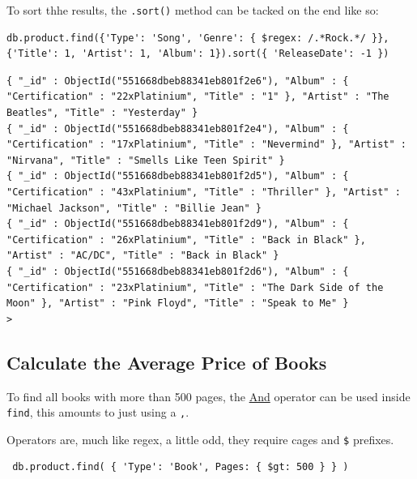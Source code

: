 \documentclass[11pt]{article}
\begin{document}
To sort thhe results, the \texttt{.sort()} method can be tacked on the end like so:

\begin{verbatim}
db.product.find({'Type': 'Song', 'Genre': { $regex: /.*Rock.*/ }}, {'Title': 1, 'Artist': 1, 'Album': 1}).sort({ 'ReleaseDate': -1 })
\end{verbatim}

\begin{verbatim}
{ "_id" : ObjectId("551668dbeb88341eb801f2e6"), "Album" : { "Certification" : "22xPlatinium", "Title" : "1" }, "Artist" : "The Beatles", "Title" : "Yesterday" }
{ "_id" : ObjectId("551668dbeb88341eb801f2e4"), "Album" : { "Certification" : "17xPlatinium", "Title" : "Nevermind" }, "Artist" : "Nirvana", "Title" : "Smells Like Teen Spirit" }
{ "_id" : ObjectId("551668dbeb88341eb801f2d5"), "Album" : { "Certification" : "43xPlatinium", "Title" : "Thriller" }, "Artist" : "Michael Jackson", "Title" : "Billie Jean" }
{ "_id" : ObjectId("551668dbeb88341eb801f2d9"), "Album" : { "Certification" : "26xPlatinium", "Title" : "Back in Black" }, "Artist" : "AC/DC", "Title" : "Back in Black" }
{ "_id" : ObjectId("551668dbeb88341eb801f2d6"), "Album" : { "Certification" : "23xPlatinium", "Title" : "The Dark Side of the Moon" }, "Artist" : "Pink Floyd", "Title" : "Speak to Me" }
>
\end{verbatim}
\subsection{Calculate the Average Price of Books}
\label{sec:org4e179ed}

To find all books with more than 500 pages, the \href{https://docs.mongodb.com/manual/tutorial/query-documents/}{And} operator can be used inside \texttt{find}, this amounts to just using a \texttt{,}.

Operators are, much like regex, a little odd, they require cages and \texttt{\$} prefixes.

\begin{verbatim}
 db.product.find( { 'Type': 'Book', Pages: { $gt: 500 } } )
\end{verbatim}
\end{document}
